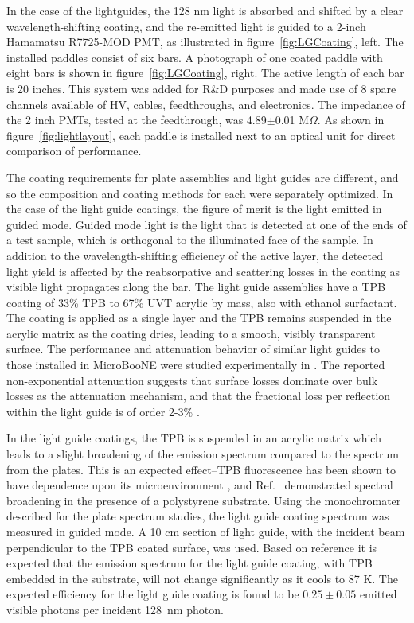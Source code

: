 In the case of the lightguides, the 128 nm light is absorbed and shifted by a clear wavelength-shifting coating, and the re-emitted light is guided to a 2-inch Hamamatsu R7725-MOD PMT, as illustrated in figure~\ref{fig:LGCoating}, left. The installed paddles consist of six bars.  A photograph of one coated paddle with eight bars is shown in figure~\ref{fig:LGCoating}, right.  The active length of each bar is 20 inches.  This system was added for R\&D purposes and made use of 8 spare channels available of HV, cables, feedthroughs, and electronics.  The impedance of the 2 inch PMTs, tested at the feedthrough, was 4.89$\pm$0.01 M$\Omega$.  As shown in figure~\ref{fig:lightlayout}, each paddle is installed next to an optical unit for direct comparison of performance.

The coating requirements for plate assemblies and light guides are different, and so the composition and coating methods for each were separately optimized.    In the case of the light guide coatings, the figure of merit is the light emitted in guided mode.  Guided mode light is the light that is detected at one of the ends of a test sample, which is orthogonal to the illuminated face of the sample.  In addition to the wavelength-shifting efficiency of the active layer, the detected light yield is affected by the reabsorpative and scattering losses in the coating as visible light propagates along the bar. The light guide assemblies have a TPB coating of 33\% TPB to 67\% UVT acrylic by mass, also with ethanol surfactant. The coating is applied as a single layer and the TPB remains suspended in the acrylic matrix as the coating dries, leading to a smooth, visibly transparent surface.  The performance and attenuation behavior of similar light guides to those installed in MicroBooNE were studied experimentally in \cite{Baptista:2012}.  The reported non-exponential attenuation suggests that surface losses dominate over bulk losses as the attenuation mechanism, and that the fractional loss per reflection within the light guide is of order 2-3\% \cite{Jones:2013}. 

In the light guide coatings, the TPB is suspended in an acrylic matrix which leads to a slight broadening of the emission spectrum compared to the spectrum from the plates. This is an expected effect--TPB fluorescence has been shown to have dependence upon its microenvironment \cite{Birks:1959,Birks:1961,Francini:2013-jinst,Hanagodimath:2008, Liu:1997}, and Ref.~\cite{Francini:2013-jinst} demonstrated spectral broadening in the presence of a polystyrene substrate.  Using the monochromater described for the plate spectrum studies, the light guide coating spectrum was measured in guided mode. A 10 cm section of light guide, with the incident beam perpendicular to the TPB coated surface, was used.  Based on reference \cite{Francini:2013-jinst} it is expected that the emission spectrum for the light guide coating, with TPB embedded in the substrate, will not change significantly as it cools to 87 K.  The expected efficiency for the light guide coating is found to be $0.25 \pm 0.05$ emitted visible photons per incident 128~nm photon.

